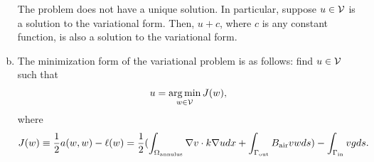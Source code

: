 \documentclass[preprint,11pt]{article}
\begin{document}
\begin{enumerate}[(a)]
  The problem does not have a unique solution.  In particular, suppose $u \in \mathcal{V}$ is a solution to the variational form.  Then, $u + c$, where $c$ is any constant function, is also a solution to the variational form.
\item The minimization form of the variational problem is as follows: find $u \in \mathcal{V}$ such that
  \begin{align*}
    u = \operatorname*{arg\,min}_{w \in \mathcal{V}} J(w),
  \end{align*}
  where
  \begin{align*}
    J(w) \equiv \frac{1}{2} a(w,w) - \ell(w)
    =
    \frac{1}{2}  (\int_{\Omega_{\rm annulus}} \nabla v \cdot k \nabla u dx + \int_{\Gamma_{\rm out}} B_{\rm air} v w ds) - \int_{\Gamma_{\rm in}} v g ds.
  \end{align*}
\end{enumerate}
\end{document}
